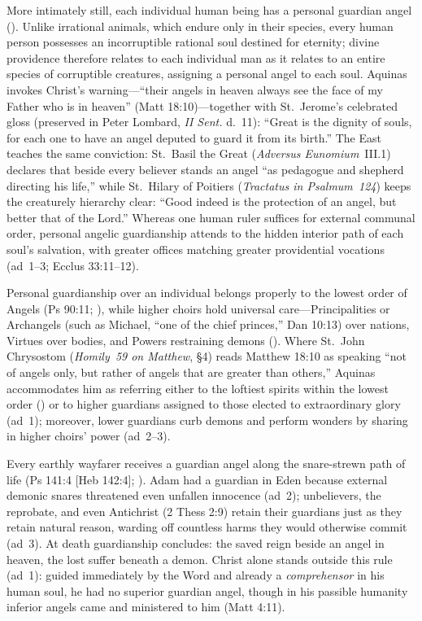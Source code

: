 More intimately still, each individual human being has a personal guardian angel (). Unlike irrational animals, which endure only in their species, every human person possesses an incorruptible rational soul destined for eternity; divine providence therefore relates to each individual man as it relates to an entire species of corruptible creatures, assigning a personal angel to each soul. Aquinas invokes Christ's warning---``their angels in heaven always see the face of my Father who is in heaven'' (Matt 18:10)---together with St.~Jerome's celebrated gloss (preserved in Peter Lombard, \emph{II Sent.} d.~11): ``Great is the dignity of souls, for each one to have an angel deputed to guard it from its birth.'' The East teaches the same conviction: St.~Basil the Great (\emph{Adversus Eunomium}~III.1) declares that beside every believer stands an angel ``as pedagogue and shepherd directing his life,'' while St.~Hilary of Poitiers (\emph{Tractatus in Psalmum~124}) keeps the creaturely hierarchy clear: ``Good indeed is the protection of an angel, but better that of the Lord.'' Whereas one human ruler suffices for external communal order, personal angelic guardianship attends to the hidden interior path of each soul's salvation, with greater offices matching greater providential vocations (ad~1--3; Ecclus 33:11--12).

Personal guardianship over an individual belongs properly to the lowest order of Angels (Ps 90:11; ), while higher choirs hold universal care---Principalities or Archangels (such as Michael, ``one of the chief princes,'' Dan 10:13) over nations, Virtues over bodies, and Powers restraining demons (). Where St.~John Chrysostom (\emph{Homily~59 on Matthew}, \S4) reads Matthew 18:10 as speaking ``not of angels only, but rather of angels that are greater than others,'' Aquinas accommodates him as referring either to the loftiest spirits within the lowest order () or to higher guardians assigned to those elected to extraordinary glory (ad~1); moreover, lower guardians curb demons and perform wonders by sharing in higher choirs' power (ad~2--3).

Every earthly wayfarer receives a guardian angel along the snare-strewn path of life (Ps 141:4 [Heb 142:4]; ). Adam had a guardian in Eden because external demonic snares threatened even unfallen innocence (ad~2); unbelievers, the reprobate, and even Antichrist (2 Thess 2:9) retain their guardians just as they retain natural reason, warding off countless harms they would otherwise commit (ad~3). At death guardianship concludes: the saved reign beside an angel in heaven, the lost suffer beneath a demon. Christ alone stands outside this rule (ad~1): guided immediately by the Word and already a \emph{comprehensor} in his human soul, he had no superior guardian angel, though in his passible humanity inferior angels came and ministered to him (Matt 4:11).

